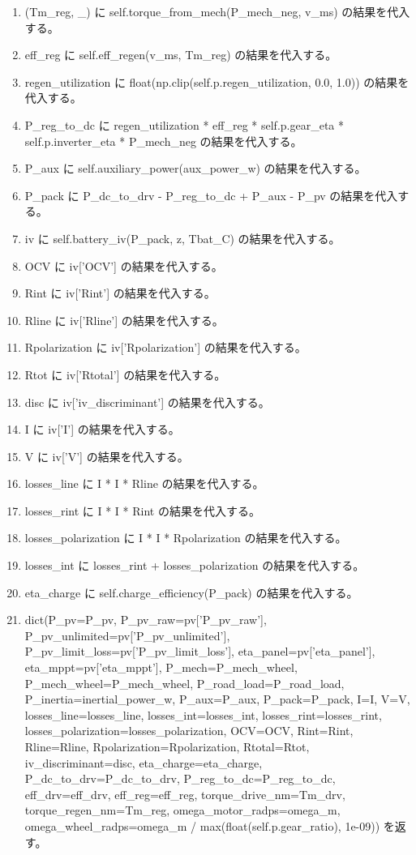 \documentclass[a4paper,11pt]{article}
\begin{document}
\begin{enumerate}[leftmargin=1.8em]
\item (Tm\_reg, \_) に self.torque\_from\_mech(P\_mech\_neg, v\_ms) の結果を代入する。
\item eff\_reg に self.eff\_regen(v\_ms, Tm\_reg) の結果を代入する。
\item regen\_utilization に float(np.clip(self.p.regen\_utilization, 0.0, 1.0)) の結果を代入する。
\item P\_reg\_to\_dc に regen\_utilization * eff\_reg * self.p.gear\_eta * self.p.inverter\_eta * P\_mech\_neg の結果を代入する。
\item P\_aux に self.auxiliary\_power(aux\_power\_w) の結果を代入する。
\item P\_pack に P\_dc\_to\_drv - P\_reg\_to\_dc + P\_aux - P\_pv の結果を代入する。
\item iv に self.battery\_iv(P\_pack, z, Tbat\_C) の結果を代入する。
\item OCV に iv['OCV'] の結果を代入する。
\item Rint に iv['Rint'] の結果を代入する。
\item Rline に iv['Rline'] の結果を代入する。
\item Rpolarization に iv['Rpolarization'] の結果を代入する。
\item Rtot に iv['Rtotal'] の結果を代入する。
\item disc に iv['iv\_discriminant'] の結果を代入する。
\item I に iv['I'] の結果を代入する。
\item V に iv['V'] の結果を代入する。
\item losses\_line に I * I * Rline の結果を代入する。
\item losses\_rint に I * I * Rint の結果を代入する。
\item losses\_polarization に I * I * Rpolarization の結果を代入する。
\item losses\_int に losses\_rint + losses\_polarization の結果を代入する。
\item eta\_charge に self.charge\_efficiency(P\_pack) の結果を代入する。
\item dict(P\_pv=P\_pv, P\_pv\_raw=pv['P\_pv\_raw'], P\_pv\_unlimited=pv['P\_pv\_unlimited'], P\_pv\_limit\_loss=pv['P\_pv\_limit\_loss'], eta\_panel=pv['eta\_panel'], eta\_mppt=pv['eta\_mppt'], P\_mech=P\_mech\_wheel, P\_mech\_wheel=P\_mech\_wheel, P\_road\_load=P\_road\_load, P\_inertia=inertial\_power\_w, P\_aux=P\_aux, P\_pack=P\_pack, I=I, V=V, losses\_line=losses\_line, losses\_int=losses\_int, losses\_rint=losses\_rint, losses\_polarization=losses\_polarization, OCV=OCV, Rint=Rint, Rline=Rline, Rpolarization=Rpolarization, Rtotal=Rtot, iv\_discriminant=disc, eta\_charge=eta\_charge, P\_dc\_to\_drv=P\_dc\_to\_drv, P\_reg\_to\_dc=P\_reg\_to\_dc, eff\_drv=eff\_drv, eff\_reg=eff\_reg, torque\_drive\_nm=Tm\_drv, torque\_regen\_nm=Tm\_reg, omega\_motor\_radps=omega\_m, omega\_wheel\_radps=omega\_m / max(float(self.p.gear\_ratio), 1e-09)) を返す。
            \end{enumerate}
\end{document}
